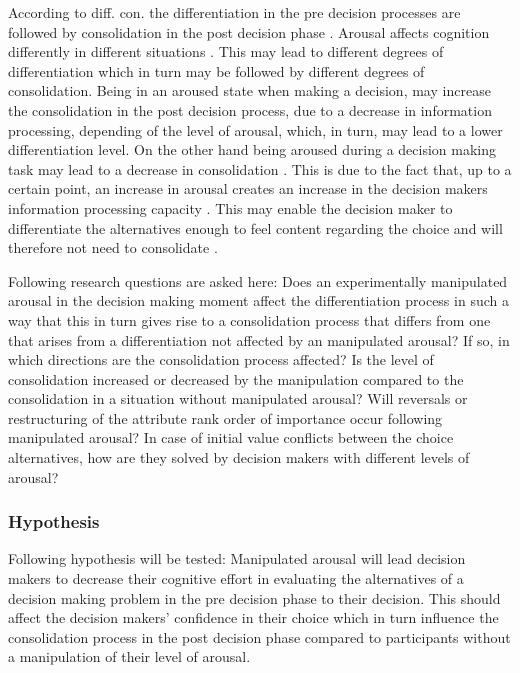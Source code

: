 \documentclass[jou,draftfirst,11pt]{apa6}
\begin{document}
According to diff. con. the differentiation  in the pre decision
processes are followed by consolidation in the post decision phase
\parencite{Svensson95}.  Arousal affects cognition differently in  different
situations \parencite{FiskeTaylor91}.  This may lead to different degrees
of differentiation which in turn may be followed by different degrees
of consolidation.  Being in an aroused state when making a decision,
may increase the consolidation in the post decision process, due to a
decrease in information processing, depending of the level of arousal,
which, in turn, may lead to a lower differentiation level.  On the
other hand being aroused during a decision making task may lead to a
decrease in consolidation \parencite{Svensson95}. This is due to  the fact
that, up to a certain point, an increase in arousal creates an
increase in the decision makers information processing capacity
\parencite{Easterbrook59}. This may enable the decision maker to
differentiate the alternatives enough to feel content regarding the
choice and will therefore not need to consolidate \parencite{svensson92b}.

Following research questions are asked here:  Does an experimentally
manipulated arousal in the decision making moment affect the
differentiation process in such a way that this in turn gives rise to
a consolidation process that differs from one that arises from a
differentiation not affected by an manipulated arousal?  If so, in
which directions are the consolidation process affected? Is the level
of consolidation increased or decreased by the manipulation compared
to the consolidation in a situation without manipulated arousal?  Will
reversals or restructuring of the attribute rank order of importance
occur following manipulated arousal? In case of initial value
conflicts between the choice alternatives,  how are they solved by
decision makers with different levels of arousal?

\subsubsection{Hypothesis} Following hypothesis will be tested: Manipulated arousal
will lead decision makers to decrease their cognitive effort in
evaluating the alternatives of a decision making problem in the pre
decision phase to their decision.  This should affect the decision
makers' confidence in their choice which in turn influence the
consolidation process in the post decision phase compared to
participants without a manipulation of their level of arousal.
\end{document}
